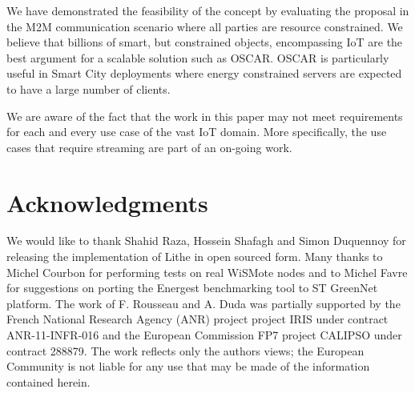 \documentclass[conference]{IEEEtran}
\begin{document}
We have demonstrated the feasibility of the concept by evaluating the proposal in
the M2M communication scenario where all parties are resource constrained. We
believe that billions of smart, but constrained objects, encompassing IoT are the
best argument for a scalable solution such as OSCAR. OSCAR is particularly
useful in Smart City deployments where energy constrained servers are expected to have
a  large number of clients. 


We are aware of the fact that the work in this paper may not meet requirements
for each and every use case of the vast IoT domain. More specifically, the use
cases that require streaming
are part of an
on-going work. 


\section*{Acknowledgments}
We would like to thank Shahid Raza, Hossein Shafagh and Simon Duquennoy for releasing the
implementation of Lithe in open sourced form. Many thanks to Michel Courbon for performing tests on real 
WiSMote nodes and to Michel Favre for suggestions on porting the Energest benchmarking tool to ST 
GreenNet platform.
The work of F. Rousseau and A. Duda was partially supported by the
French National Research Agency (ANR) project project IRIS under contract
ANR-11-INFR-016 and the European Commission FP7 project CALIPSO under contract
288879. The work reflects only the authors views; the European Community is not
liable for any use that may be made of the information contained herein. 

 

\end{document}
